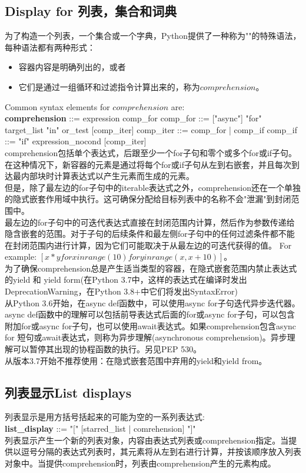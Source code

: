 \documentclass[10pt,UTF8]{ctexart}
\begin{document}
\subsection{Display for 列表，集合和词典}
为了构造一个列表，一个集合或一个字典，Python提供了一种称为""的特殊语法，每种语法都有两种形式：
\begin{itemize}
\item 容器内容是明确列出的，或者
\item 它们是通过一组循环和过滤指令计算出来的，称为$\mathit{comprehension}$。
\end{itemize}
Common syntax elements for $\mathit{comprehension}$ are:\\
\textbf{comprehension} ::= expression comp_for
comp_for ::= ["async"] "for" target_list "in" or_test [comp_iter]
comp_iter ::= comp_for | comp_if
comp_if ::= "if" expression_nocond [comp_iter]\\
\indent comprehension包括单个表达式，后跟至少一个for子句和零个或多个for或if子句。在这种情况下，新容器的元素是通过将每个for或if子句从左到右嵌套，并且每次到达最内部块时计算表达式以产生元素而生成的元素。\\
\indent 但是，除了最左边的for子句中的iterable表达式之外，comprehension还在一个单独的隐式嵌套作用域中执行。这可确保分配给目标列表中的名称不会"泄漏"到封闭范围中。\\
\indent 最左边的for子句中的可迭代表达式直接在封闭范围内计算，然后作为参数传递给隐含嵌套的范围。对于子句的后续条件和最左侧for子句中的任何过滤条件都不能在封闭范围内进行计算，因为它们可能取决于从最左边的可迭代获得的值。 For example: $[x*y for x in range(10) for y in range(x, x+10)]$。\\
\indent 为了确保comprehension总是产生适当类型的容器，在隐式嵌套范围内禁止表达式的yield 和 yield form(在Python 3.7中，这样的表达式在编译时发出DeprecationWarning，在Python 3.8+中它们将发出SyntaxError)\\
\indent 从Python 3.6开始，在async def函数中，可以使用async for子句迭代异步​​迭代器。async def函数中的理解可以包括前导表达式后面的for或async for子句，可以包含附加for或async for子句，也可以使用await表达式。如果comprehension包含async for 短句或await表达式，则称为异步理解(asynchronous comprehension)。异步理解可以暂停其出现的协程函数的执行。另见PEP 530。\\
\indent 从版本3.7开始不推荐使用：在隐式嵌套范围中弃用的yield和yield from。
\subsection{列表显示List displays}
列表显示是用方括号括起来的可能为空的一系列表达式:\\
\textbf{list_display} ::= "[" [starred_list | comrehension] "]"\\
\indent 列表显示产生一个新的列表对象，内容由表达式列表或comprehension指定。当提供以逗号分隔的表达式列表时，其元素将从左到右进行计算，并按该顺序放入列表对象中。当提供comprehension时，列表由comprehension产生的元素构成。
\end{document}
